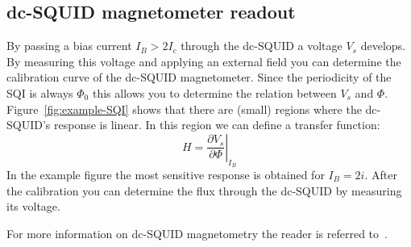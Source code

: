 \subsection{dc-SQUID magnetometer readout}
By passing a bias current $I_B > 2I_c$ through the dc-SQUID a voltage $V_s$ develops. By measuring this voltage and applying an external field you can determine the calibration curve of the dc-SQUID magnetometer. Since the periodicity of the SQI is always $\Phi_0$ this allows you to determine the relation between $V_s$ and $\Phi$. Figure~\ref{fig:example-SQI} shows that there are (small) regions where the dc-SQUID's response is linear. In this region we can define a transfer function\cite{rogSQUIDontipMagneticMicroscopy2022}:
\begin{equation}
	H = \left. \frac{\partial V_s}{\partial \Phi} \right|_{I_B}
\end{equation}
In the example figure the most sensitive response is obtained for $I_B = 2i$. After the calibration you can determine the flux through the dc-SQUID by measuring its voltage.

For more information on dc-SQUID magnetometry the reader is referred to~\cite{tinkhamIntroductionSuperconductivity,clarkeSQUIDHandbook2004,schmelzSuperconductingQuantumInterference2017}.